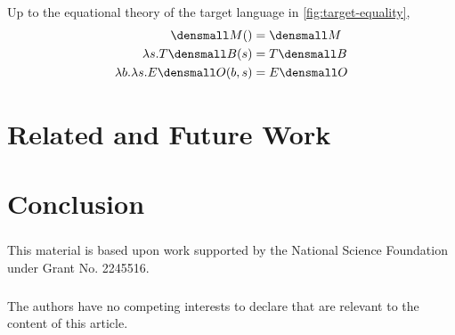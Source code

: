 \documentclass[runningheads]{llncs}
\begin{document}
\begin{proposition}
  Up to the equational theory of the target language in
  \cref{fig:target-equality},
  \begin{align*}
    \den{M}() &= \den{M}
    \\
    \lambda s. T\den{B}(s) &= T\den{B}
    \\
    \lambda b. \lambda s. E\den{O}(b, s) &= E\den{O}
  \end{align*}  
\end{proposition}

\section{Related and Future Work}

\section{Conclusion}

\begin{credits}
\subsubsection{\ackname}
% 
This material is based upon work supported by the National Science Foundation
under Grant No. 2245516.

\subsubsection{\discintname}
%
The authors have no competing interests to declare that are
relevant to the content of this article.
\end{credits}
%
%
%


\end{document}
